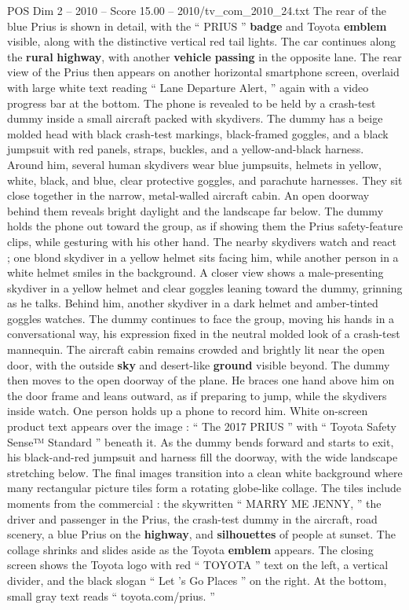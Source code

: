 \begin{textsample}{POS Dim 2 – 2010 – Score 15.00 – 2010/tv\_com\_2010\_24.txt}
The rear of the blue Prius is shown in detail, with the “ PRIUS ” \textbf{badge} and Toyota \textbf{emblem} visible, along with the distinctive vertical red tail lights.
The car continues along the \textbf{rural} \textbf{highway}, with another \textbf{vehicle} \textbf{passing} in the opposite lane.
The rear view of the Prius then appears on another horizontal smartphone screen, overlaid with large white text reading “ Lane Departure Alert, ” again with a video progress bar at the bottom.
The phone is revealed to be held by a crash-test dummy inside a small aircraft packed with skydivers.
The dummy has a beige molded head with black crash-test markings, black-framed goggles, and a black jumpsuit with red panels, straps, buckles, and a yellow-and-black harness.
Around him, several human skydivers wear blue jumpsuits, helmets in yellow, white, black, and blue, clear protective goggles, and parachute harnesses.
They sit close together in the narrow, metal-walled aircraft cabin.
An open doorway behind them reveals bright daylight and the landscape far below.
The dummy holds the phone out toward the group, as if showing them the Prius safety-feature clips, while gesturing with his other hand.
The nearby skydivers watch and react ; one blond skydiver in a yellow helmet sits facing him, while another person in a white helmet smiles in the background.
A closer view shows a male-presenting skydiver in a yellow helmet and clear goggles leaning toward the dummy, grinning as he talks.
Behind him, another skydiver in a dark helmet and amber-tinted goggles watches.
The dummy continues to face the group, moving his hands in a conversational way, his expression fixed in the neutral molded look of a crash-test mannequin.
The aircraft cabin remains crowded and brightly lit near the open door, with the outside \textbf{sky} and desert-like \textbf{ground} visible beyond.
The dummy then moves to the open doorway of the plane.
He braces one hand above him on the door frame and leans outward, as if preparing to jump, while the skydivers inside watch.
One person holds up a phone to record him.
White on-screen product text appears over the image : “ The 2017 PRIUS ” with “ Toyota Safety Sense{\EmojiFont ™} Standard ” beneath it.
As the dummy bends forward and starts to exit, his black-and-red jumpsuit and harness fill the doorway, with the wide landscape stretching below.
The final images transition into a clean white background where many rectangular picture tiles form a rotating globe-like collage.
The tiles include moments from the commercial : the skywritten “ MARRY ME JENNY, ” the driver and passenger in the Prius, the crash-test dummy in the aircraft, road scenery, a blue Prius on the \textbf{highway}, and \textbf{silhouettes} of people at sunset.
The collage shrinks and slides aside as the Toyota \textbf{emblem} appears.
The closing screen shows the Toyota logo with red “ TOYOTA ” text on the left, a vertical divider, and the black slogan “ Let ’s Go Places ” on the right.
At the bottom, small gray text reads “ toyota.com/prius. ”

\end{textsample}
